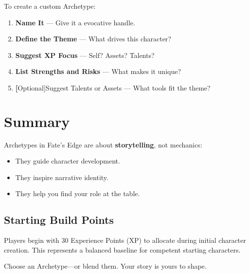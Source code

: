 To create a custom Archetype:

\begin{enumerate}
  \item \textbf{Name It} — Give it a evocative handle.
  \item \textbf{Define the Theme} — What drives this character?
  \item \textbf{Suggest XP Focus} — Self? Assets? Talents?
  \item \textbf{List Strengths and Risks} — What makes it unique?
  \item \textbf[Optional]{Suggest Talents or Assets} — What tools fit the theme?
\end{enumerate}

\section{Summary}

Archetypes in Fate’s Edge are about \textbf{storytelling}, not mechanics:

\begin{itemize}
  \item They guide character development.
  \item They inspire narrative identity.
  \item They help you find your role at the table.
\end{itemize}

\subsection{Starting Build Points}
Players begin with 30 Experience Points (XP) to allocate during initial character creation. This represents a balanced baseline for competent starting characters.

Choose an Archetype—or blend them. Your story is yours to shape.

